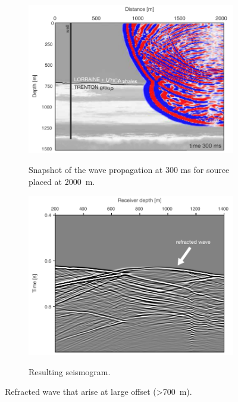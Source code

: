 \begin{figure}[!ht]
        \centering
        \begin{subfigure}[b]{0.75\textwidth}
                \caption{Snapshot of the wave propagation at 300 ms for source
placed at \SI{2000}{\metre}.}
                \includegraphics[width=1\textwidth]{fig/refracted_new_a.pdf}
                \label{fig:refracted_a}
        \end{subfigure}%

        \begin{subfigure}[b]{0.75\textwidth}
                \caption{Resulting seismogram.}
                \includegraphics[width=1\textwidth]{fig/refracted_new_b.pdf}
                \label{fig:refracted_b}
        \end{subfigure}

        \caption{Refracted wave that arise at large offset (\SI{>700}{\metre}).}
        \label{fig:refracted}
\end{figure}


